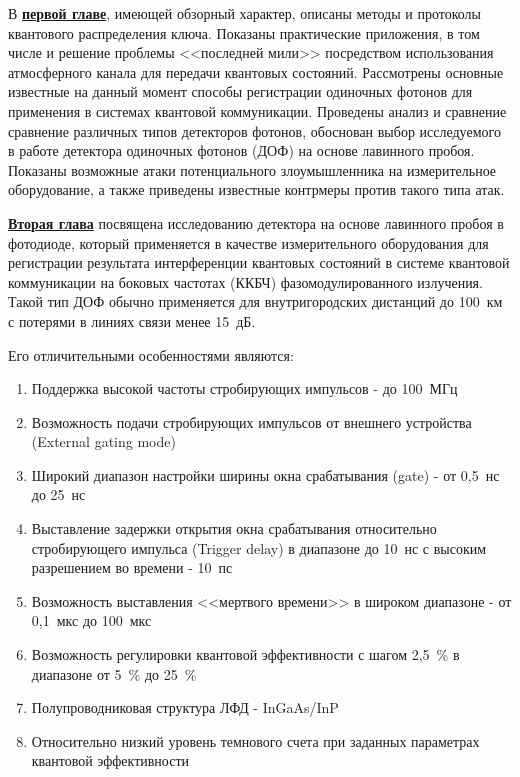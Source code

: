  В \underline{\textbf{первой главе}}, имеющей обзорный характер, описаны методы и протоколы квантового распределения ключа. Показаны практические приложения, в том числе и решение проблемы <<последней мили>> посредством использования атмосферного канала для передачи квантовых состояний. Рассмотрены основные известные на данный момент способы регистрации одиночных фотонов для применения в системах квантовой коммуникации. Проведены анализ и сравнение сравнение различных типов детекторов фотонов, обоснован выбор исследуемого в работе детектора одиночных фотонов (ДОФ) на основе лавинного пробоя. Показаны возможные атаки потенциального злоумышленника на измерительное оборудование, а также приведены известные контрмеры против такого типа атак.   



 \underline{\textbf{Вторая глава}} посвящена исследованию детектора на основе лавинного пробоя в фотодиоде, который применяется в качестве измерительного оборудования для регистрации результата интерференции квантовых состояний в системе квантовой коммуникации на боковых частотах (ККБЧ) фазомодулированного излучения. Такой тип ДОФ обычно применяется для внутригородских дистанций до 100~км с потерями в линиях связи менее 15~дБ. 

Его отличительными особенностями являются:
\begin{enumerate}
	\item Поддержка высокой частоты стробирующих импульсов - до 100~МГц
	\item Возможность подачи стробирующих импульсов от внешнего устройства (External gating mode)
	\item Широкий диапазон настройки ширины окна срабатывания (gate) - от 0,5~нс до 25~нс
	\item Выставление задержки открытия окна срабатывания относительно стробирующего импульса (Trigger delay) в диапазоне до 10~нс с высоким разрешением во времени - 10~пс 
	\item Возможность выставления <<мертвого времени>> в широком диапазоне - от 0,1~мкс до 100~мкс
	\item Возможность регулировки квантовой эффективности с шагом 2,5~\% в диапазоне от 5~\% до 25~\%
	\item Полупроводниковая структура ЛФД - InGaAs/InP
	\item Относительно низкий уровень темнового счета при заданных параметрах квантовой эффективности
\end{enumerate}

